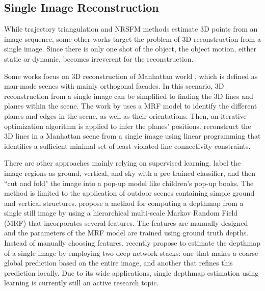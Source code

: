 \subsection{Single Image Reconstruction}
While trajectory triangulation and NRSFM methods estimate 3D points from an image sequence, some other works target the problem of 3D reconstruction from a single image. Since there is only one shot of the object, the object motion, either static or dynamic, becomes irreverent for the reconstruction. 

Some works focus on 3D reconstruction of Manhattan world \cite{Coughlan_ICCV99}, which is defined as
man-made scenes with mainly orthogonal facades. In this scenario, 3D reconstruction from a single image can be simplified to finding the 3D lines and planes within the scene. The work by \citet{Delage_ISRR2005} uses a MRF model to identify the different planes and edges in the scene, as well as their orientations. Then, an iterative optimization algorithm is applied to infer the planes' positions. \citet{Ram_ICCV2013} reconstruct the 3D lines in a Manhattan scene from a single image using linear programming that identifies a sufficient minimal set of least-violated line connectivity constraints.

There are other approaches mainly relying on supervised learning. 
\citet{Hoiem_CGRAPH2005} label the image regions as ground, vertical, and sky with a pre-trained classifier, and then ``cut and fold" the image into a pop-up model like children's pop-up books. The method is limited to the application of outdoor scenes containing simple ground and vertical structures.
\citet{Saxena_IJCV2008} propose a method for computing a depthmap from a single still image by using a hierarchical multi-scale Markov Random Field (MRF) that incorporates several features. The features are manually designed and the parameters of the MRF model are trained using ground truth depths. Instead of manually choosing features, \citet{eigen2014depth} recently propose to estimate the depthmap of a single image by employing two deep network stacks: one that makes a coarse global prediction based on the entire image, and another that refines this prediction locally. 
Due to its wide applications, single depthmap estimation using learning is currently still an active research topic.


















